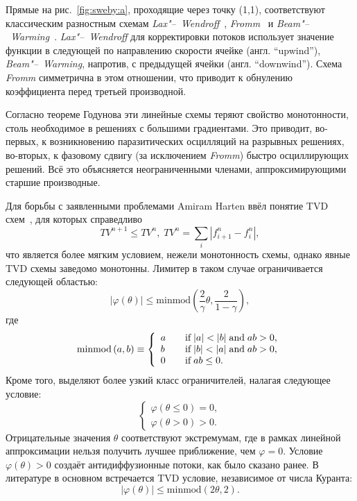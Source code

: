 \documentclass[a4paper,10pt]{article}
\begin{document}
Прямые на рис.~\ref{fig:sweby:a}, проходящие через точку (1,1), соответствуют классическим разностным схемам
\textit{Lax"--~Wendroff}~\cite{Lax1960}, \textit{Fromm}~\cite{Fromm1968} и \textit{Beam"--~Warming}~\cite{Warming1975}.
\textit{Lax"--~Wendroff} для корректировки потоков использует значение функции в следующей по направлению скорости ячейке
(англ. ``upwind''), \textit{Beam"--~Warming}, напротив, с предыдущей ячейки (англ. ``downwind''). Схема \textit{Fromm} симметрична в этом отношении,
что приводит к обнулению коэффициента перед третьей производной.

Согласно теореме Годунова эти линейные схемы теряют свойство монотонности, столь необходимое в решениях с большими градиентами.
Это приводит, во-первых, к возникновению паразитических осцилляций на разрывных решениях,
во-вторых, к фазовому сдвигу (за исключением \textit{Fromm}) быстро осциллирующих решений.
Всё это объясняется неограниченными членами, аппроксимирующими старшие производные.

Для борьбы с заявленными проблемами Amiram Harten ввёл понятие TVD схем~\cite{Harten1983}, для которых справедливо
\[ TV^{n+1}\le TV^n, \; TV^n = \sum_i| f_{i+1}^n - f_i^n |, \]
что является более мягким условием, нежели монотонность схемы, однако явные TVD схемы заведомо монотонны.
Лимитер в таком случае ограничивается следующей областью:
\[ \left|\varphi(\theta)\right| \leq \mathrm{minmod}\left(\frac2{\gamma}\theta,\frac2{1-\gamma}\right), \] где
\[
\mathrm{minmod}\,(a,b) \equiv \left\{
\begin{array}{l l}
	a & \quad \text{if}\;|a|<|b| \;\text{and}\;ab>0, \\
	b & \quad \text{if}\;|b|<|a| \;\text{and}\;ab>0, \\
	0 & \quad \text{if}\;ab \leq 0.
\end{array}\right.
\]
Кроме того, выделяют более узкий класс ограничителей, налагая следующее условие:
\[ \left\{
\begin{array}{l}
	\varphi(\theta\le0)=0, \\
	\varphi(\theta>0) > 0.
\end{array}\right.
\]
Отрицательные значения \(\theta\) соответствуют экстремумам, где в рамках линейной аппроксимации нельзя получить лучшее приближение, чем \(\varphi=0\).
Условие \(\varphi(\theta)>0\) создаёт антидиффузионные потоки, как было сказано ранее.
В литературе в основном встречается TVD условие, независимое от числа Куранта:
\[ \left|\varphi(\theta)\right| \leq \mathrm{minmod}(2\theta,2). \]
\end{document}
